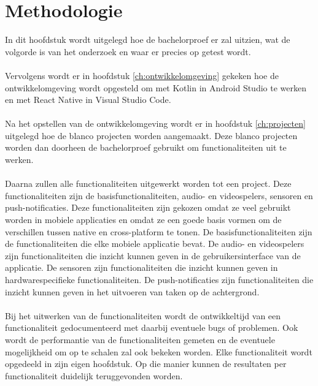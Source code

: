 
\chapter{Methodologie}
\label{ch:methodologie}

In dit hoofdstuk wordt uitgelegd hoe de bachelorproef er zal uitzien, wat 
de volgorde is van het onderzoek en waar er precies op getest wordt.
\\\\
Vervolgens wordt er in hoofdstuk \ref{ch:ontwikkelomgeving} gekeken hoe 
de ontwikkelomgeving wordt opgesteld om met Kotlin in Android Studio 
te werken en met React Native in Visual Studio Code.
\\\\
Na het opstellen van de ontwikkelomgeving wordt er in hoofdstuk 
\ref{ch:projecten} uitgelegd hoe de blanco projecten worden aangemaakt. 
Deze blanco projecten worden dan doorheen de bachelorproef gebruikt om 
functionaliteiten uit te werken.
\\\\
Daarna zullen alle functionaliteiten uitgewerkt worden tot een project. 
Deze functionaliteiten zijn de basisfunctionaliteiten, audio- en
videospelers, sensoren en push-notificaties. Deze functionaliteiten
zijn gekozen omdat ze veel gebruikt worden in mobiele applicaties en
omdat ze een goede basis vormen om de verschillen tussen native en cross-platform 
te tonen. De basisfunctionaliteiten zijn de functionaliteiten die
elke mobiele applicatie bevat. De audio- en videospelers zijn functionaliteiten die
inzicht kunnen geven in de gebruikersinterface van de applicatie. De sensoren
zijn functionaliteiten die inzicht kunnen geven in hardwarespecifieke functionaliteiten.
De push-notificaties zijn functionaliteiten die inzicht kunnen geven in het 
uitvoeren van taken op de achtergrond.
\\\\
Bij het uitwerken van de functionaliteiten wordt 
de ontwikkeltijd van een functionaliteit gedocumenteerd 
met daarbij eventuele bugs of problemen. Ook wordt de performantie van 
de functionaliteiten gemeten en de eventuele mogelijkheid om op te 
schalen zal ook bekeken worden. Elke functionaliteit wordt opgedeeld 
in zijn eigen hoofdstuk. Op die manier kunnen de resultaten per 
functionaliteit duidelijk teruggevonden worden.
